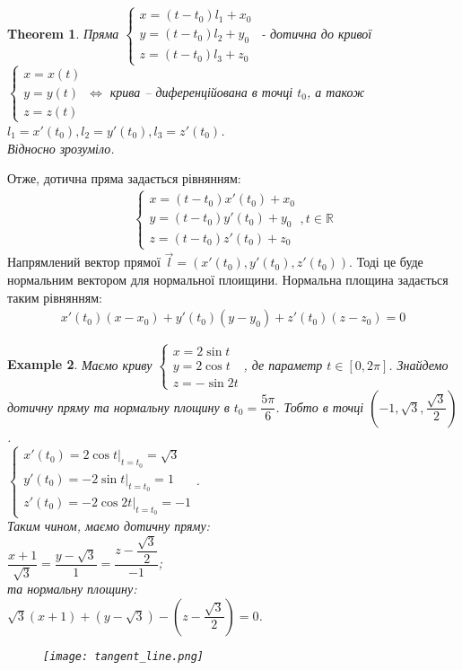 \documentclass[a4paper, 10pt]{article}
\theoremstyle{theoremdd}
\newtheorem{theorem}{Theorem}[subsection]
\theoremstyle{theoremdd}
\theoremstyle{theoremdd}
\theoremstyle{theoremdd}
\theoremstyle{theoremdd}
\newtheorem{example}[theorem]{Example}
\theoremstyle{theoremdd}
\theoremstyle{theoremdd}
\theoremstyle{theoremdd}
\theoremstyle{theoremdd}
\begin{document}
\begin{theorem}
Пряма $\begin{cases} x = (t-t_0)l_1 + x_0 \\ y = (t-t_0)l_2 + y_0 \\ z = (t-t_0)l_3 + z_0 \end{cases}$ - дотична до кривої $\begin{cases} x = x(t) \\ y = y(t) \\ z = z(t) \end{cases} \iff$ крива -- диференційована в точці $t_0$, а також $l_1 = x'(t_0), l_2 = y'(t_0), l_3 = z'(t_0)$.\\
\textit{Відносно зрозуміло.}
\end{theorem}
Отже, дотична пряма задається рівнянням:
\begin{align*}
\begin{cases}
x=(t-t_0) x'(t_0)+x_0 \\
y=(t-t_0) y'(t_0)+y_0\\
z=(t-t_0) z'(t_0)+z_0
\end{cases}, t \in \mathbb{R}
\end{align*}
Напрямлений вектор прямої $\vec{l} = (x'(t_0),y'(t_0),z'(t_0))$. Тоді це буде нормальним вектором для нормальної плоищини. Нормальна площина задається таким рівнянням:
\begin{align*}
x'(t_0)(x-x_0) + y'(t_0)(y-y_0) + z'(t_0)(z-z_0) = 0
\end{align*}

\begin{example}
Маємо криву $\begin{cases} x = 2 \sin t \\ y = 2 \cos t \\ z = -\sin 2t \end{cases}$, де параметр $t \in [0,2\pi]$. Знайдемо дотичну пряму та нормальну площину в $t_0 = \dfrac{5 \pi}{6}$. Тобто в точці $\left(-1,\sqrt{3}, \dfrac{\sqrt{3}}{2} \right)$.\\
$\begin{cases}
x'(t_0) = 2 \cos t \Big|_{t = t_0} = \sqrt{3} \\
y'(t_0) = -2 \sin t \Big|_{t = t_0} = 1 \\
z'(t_0) = -2 \cos 2t \Big|_{t = t_0} = -1
\end{cases}$.\\
Таким чином, маємо дотичну пряму:\\
$\dfrac{x+1}{\sqrt{3}} = \dfrac{y-\sqrt{3}}{1} = \dfrac{z-\dfrac{\sqrt{3}}{2}}{-1}$;\\
та нормальну площину:\\
$\sqrt{3}(x+1) + (y-\sqrt{3}) - \left( z - \dfrac{\sqrt{3}}{2} \right) = 0$.
\begin{figure}[H]
\centering
\texttt{[image: tangent\_line.png]}
\end{figure}
\end{example}
\end{document}
